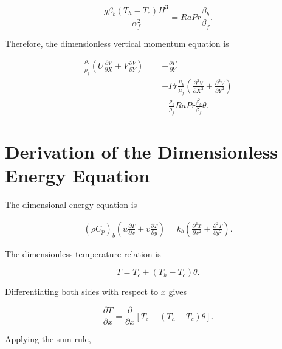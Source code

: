 \documentclass[preprint,3p,number]{elsarticle}
\begin{document}
\begin{equation}
\frac{g\beta_b(T_h-T_c)H^3}{\alpha_f^2}
=
RaPr\frac{\beta_b}{\beta_f}.
\end{equation}

Therefore, the dimensionless vertical momentum equation is

\begin{equation}
\boxed{
\begin{aligned}
\frac{\rho_b}{\rho_f}
\left(
U\frac{\partial V}{\partial X}
+
V\frac{\partial V}{\partial Y}
\right)
={}&-\frac{\partial P}{\partial Y}\\
&+Pr\frac{\mu_b}{\mu_f}
\left(
\frac{\partial^2V}{\partial X^2}
+
\frac{\partial^2V}{\partial Y^2}
\right)\\
&+\frac{\rho_b}{\rho_f}
RaPr\frac{\beta_b}{\beta_f}\theta.
\end{aligned}
}
\label{eq:vertical_dimensionless}
\end{equation}

\section{Derivation of the Dimensionless Energy Equation}

The dimensional energy equation is

\begin{equation}
\begin{aligned}
(\rho C_p)_b
\left(
u\frac{\partial T}{\partial x}
+
v\frac{\partial T}{\partial y}
\right)
=
k_b
\left(
\frac{\partial^2T}{\partial x^2}
+
\frac{\partial^2T}{\partial y^2}
\right).
\end{aligned}
\label{eq:energy_start}
\end{equation}

The dimensionless temperature relation is

\begin{equation}
T=T_c+(T_h-T_c)\theta.
\end{equation}

Differentiating both sides with respect to \(x\) gives

\begin{equation}
\frac{\partial T}{\partial x}
=
\frac{\partial}{\partial x}
\left[T_c+(T_h-T_c)\theta\right].
\end{equation}

Applying the sum rule,
\end{document}
